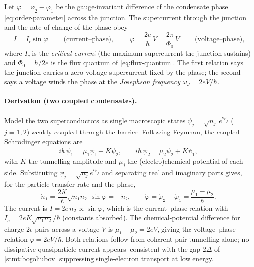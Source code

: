 \begin{statement}
\label{stmt:josephson-relations}
Let $\varphi=\varphi_2-\varphi_1$ be the gauge-invariant difference of
the condensate phase \cref{eq:order-parameter} across the junction.
The supercurrent through the junction and the rate of change of the
phase obey
\begin{equation}
\label{eq:josephson-relations}
\boxed{\;I = I_c\sin\varphi\;}
\qquad\text{(current--phase)},
\qquad
\boxed{\;\dot\varphi = \frac{2e}{\hbar}\,V = \frac{2\pi}{\Phi_0}\,V\;}
\qquad\text{(voltage--phase)},
\end{equation}
where $I_c$ is the \emph{critical current} (the maximum supercurrent
the junction sustains) and $\Phi_0=h/2e$ is the flux quantum of
\cref{eq:flux-quantum}. The first relation says the junction carries a
zero-voltage supercurrent fixed by the phase; the second says a
voltage winds the phase at the \emph{Josephson frequency}
$\omega_J=2eV/\hbar$.
\end{statement}

\paragraph{Derivation (two coupled condensates).}
Model the two superconductors as single macroscopic states
$\psi_j=\sqrt{n_j}\,e^{i\varphi_j}$ ($j=1,2$) weakly coupled through
the barrier. Following Feynman, the coupled Schr\"odinger equations are
\begin{equation}
\label{eq:feynman-coupled}
i\hbar\,\dot\psi_1 = \mu_1\psi_1 + K\psi_2,
\qquad
i\hbar\,\dot\psi_2 = \mu_2\psi_2 + K\psi_1,
\end{equation}
with $K$ the tunnelling amplitude and $\mu_j$ the (electro)chemical
potential of each side. Substituting $\psi_j=\sqrt{n_j}e^{i\varphi_j}$
and separating real and imaginary parts gives, for the particle
transfer rate and the phase,
\begin{equation}
\label{eq:feynman-result}
\dot n_1 = \frac{2K}{\hbar}\sqrt{n_1 n_2}\,\sin\varphi = -\dot n_2,
\qquad
\dot\varphi = \dot\varphi_2-\dot\varphi_1 = \frac{\mu_1-\mu_2}{\hbar}.
\end{equation}
The current is $I=2e\,\dot n_2 \propto \sin\varphi$, which is the
current--phase relation with $I_c=2eK\sqrt{n_1n_2}/\hbar$ (constants
absorbed). The chemical-potential difference for charge-$2e$ pairs
across a voltage $V$ is $\mu_1-\mu_2=2eV$, giving the voltage--phase
relation $\dot\varphi=2eV/\hbar$. Both relations follow from coherent
pair tunnelling alone; no dissipative quasiparticle current appears,
consistent with the gap $2\Delta$ of \cref{stmt:bogoliubov} suppressing
single-electron transport at low energy.

